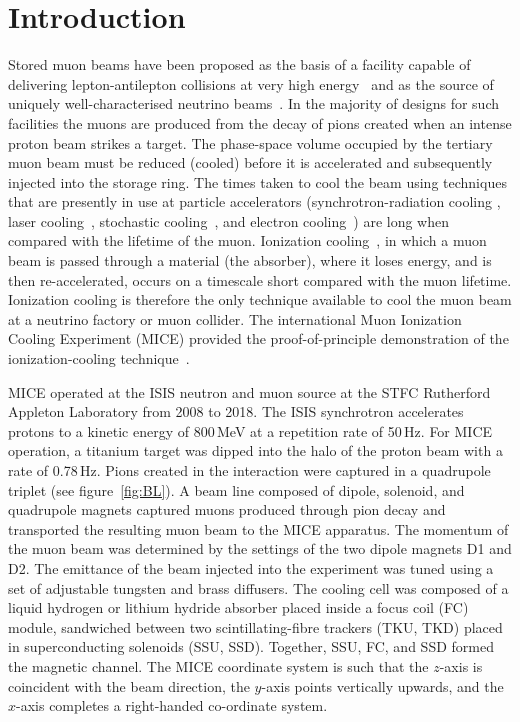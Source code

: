 \graphicspath{{01-Introduction/Figures/}}

\section{Introduction}
\label{Sect:Intro}

Stored muon beams have been proposed as the basis of a facility
capable of delivering lepton-antilepton collisions at very high
energy~\cite{Neuffer:1994bt,Palmer:2014nza} and as the source of
uniquely well-characterised neutrino 
beams~\cite{Geer:1998PhRvD..57.6989G,Bandyopadhyay:2007kx,Apollonio:2002en}.
In the majority of designs for such facilities the muons are produced
from the decay of pions created when an intense proton beam strikes a
target.
The phase-space volume occupied by the tertiary muon beam must be
reduced (cooled) before it is accelerated and subsequently injected
into the storage ring.
The times taken to cool the beam using techniques that are presently in
use at particle accelerators (synchrotron-radiation cooling
\cite{2012acph.book.....L}, laser
cooling~\cite{PhysRevLett.64.2901,PhysRevLett.67.1238,doi:10.1063/1.329218},
stochastic cooling~\cite{Marriner:2003mn}, and electron
cooling~\cite{1063-7869-43-5-R01}) are long when compared with the
lifetime of the muon.
Ionization cooling~\cite{cooling_methods,Neuffer:1983jr}, in which a
muon beam is passed through a material (the absorber), where it
loses energy, and is then re-accelerated, occurs on a timescale short
compared with the muon lifetime.
Ionization cooling is therefore the only technique available to cool the muon beam at a neutrino factory or muon collider.
The international Muon Ionization Cooling Experiment (MICE)
provided the proof-of-principle demonstration of the
ionization-cooling technique~\cite{Bogomilov:2019kfj}.

MICE operated at the ISIS neutron and muon source at the STFC
Rutherford Appleton Laboratory from 2008 to 2018.  
The ISIS synchrotron accelerates protons to a kinetic energy of 800\,MeV at a repetition rate of
50\,Hz.
For MICE operation, a titanium target was dipped
into the halo of the proton beam with a rate of 0.78\,Hz. 
Pions created in the interaction were captured in a quadrupole triplet
(see figure~\ref{fig:BL}).
A beam line composed of dipole, solenoid, and quadrupole
magnets captured muons produced through pion decay and transported the
resulting muon beam to the MICE apparatus.
The momentum of the muon beam was determined by the settings of the two dipole magnets D1 and D2.
The emittance of the beam injected into the experiment was tuned using
a set of adjustable tungsten and brass diffusers.
The cooling cell was composed of a liquid hydrogen or lithium hydride
absorber placed inside a focus coil (FC) module, sandwiched between
two scintillating-fibre trackers (TKU, TKD) placed in superconducting
solenoids (SSU, SSD).
Together, SSU, FC, and SSD formed the magnetic channel.
The MICE coordinate system is such that the $z$-axis is coincident
with the beam direction, the $y$-axis points vertically upwards, and the
$x$-axis completes a right-handed co-ordinate system.

